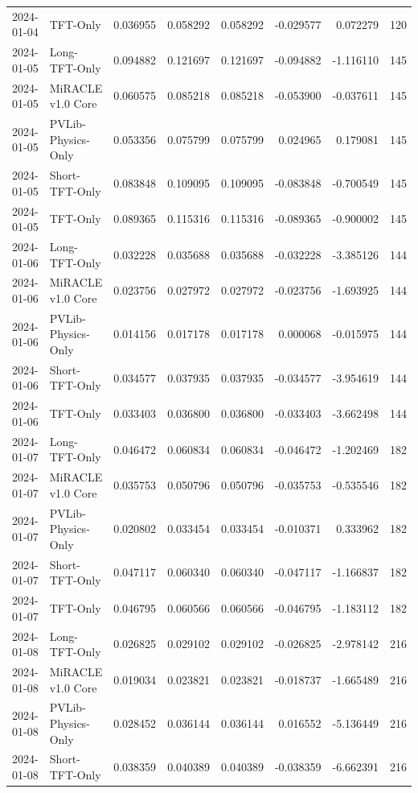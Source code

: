 \begin{tabular}{llrrrrrr}
2024-01-04 & TFT-Only & 0.036955 & 0.058292 & 0.058292 & -0.029577 & 0.072279 & 120 \\
2024-01-05 & Long-TFT-Only & 0.094882 & 0.121697 & 0.121697 & -0.094882 & -1.116110 & 145 \\
2024-01-05 & MiRACLE v1.0 Core & 0.060575 & 0.085218 & 0.085218 & -0.053900 & -0.037611 & 145 \\
2024-01-05 & PVLib-Physics-Only & 0.053356 & 0.075799 & 0.075799 & 0.024965 & 0.179081 & 145 \\
2024-01-05 & Short-TFT-Only & 0.083848 & 0.109095 & 0.109095 & -0.083848 & -0.700549 & 145 \\
2024-01-05 & TFT-Only & 0.089365 & 0.115316 & 0.115316 & -0.089365 & -0.900002 & 145 \\
2024-01-06 & Long-TFT-Only & 0.032228 & 0.035688 & 0.035688 & -0.032228 & -3.385126 & 144 \\
2024-01-06 & MiRACLE v1.0 Core & 0.023756 & 0.027972 & 0.027972 & -0.023756 & -1.693925 & 144 \\
2024-01-06 & PVLib-Physics-Only & 0.014156 & 0.017178 & 0.017178 & 0.000068 & -0.015975 & 144 \\
2024-01-06 & Short-TFT-Only & 0.034577 & 0.037935 & 0.037935 & -0.034577 & -3.954619 & 144 \\
2024-01-06 & TFT-Only & 0.033403 & 0.036800 & 0.036800 & -0.033403 & -3.662498 & 144 \\
2024-01-07 & Long-TFT-Only & 0.046472 & 0.060834 & 0.060834 & -0.046472 & -1.202469 & 182 \\
2024-01-07 & MiRACLE v1.0 Core & 0.035753 & 0.050796 & 0.050796 & -0.035753 & -0.535546 & 182 \\
2024-01-07 & PVLib-Physics-Only & 0.020802 & 0.033454 & 0.033454 & -0.010371 & 0.333962 & 182 \\
2024-01-07 & Short-TFT-Only & 0.047117 & 0.060340 & 0.060340 & -0.047117 & -1.166837 & 182 \\
2024-01-07 & TFT-Only & 0.046795 & 0.060566 & 0.060566 & -0.046795 & -1.183112 & 182 \\
2024-01-08 & Long-TFT-Only & 0.026825 & 0.029102 & 0.029102 & -0.026825 & -2.978142 & 216 \\
2024-01-08 & MiRACLE v1.0 Core & 0.019034 & 0.023821 & 0.023821 & -0.018737 & -1.665489 & 216 \\
2024-01-08 & PVLib-Physics-Only & 0.028452 & 0.036144 & 0.036144 & 0.016552 & -5.136449 & 216 \\
2024-01-08 & Short-TFT-Only & 0.038359 & 0.040389 & 0.040389 & -0.038359 & -6.662391 & 216 \\

\end{tabular}
